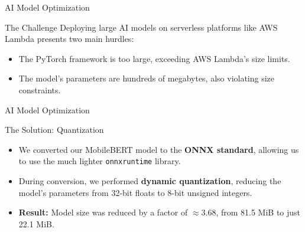 \documentclass{beamer}
\begin{document}
\begin{frame}{AI Model Optimization}
    \begin{alertblock}{The Challenge}
        Deploying large AI models on serverless platforms like AWS Lambda presents two main hurdles:
        \begin{itemize}
            \item The PyTorch framework is too large, exceeding AWS Lambda's size limits.
            \item The model's parameters are hundreds of megabytes, also violating size constraints.
        \end{itemize}
    \end{alertblock}
\end{frame}

\begin{frame}{AI Model Optimization}
    \begin{exampleblock}{The Solution: Quantization}
        \begin{itemize}
            \item We converted our MobileBERT model to the \textbf{ONNX standard}, allowing us to use the much lighter \texttt{onnxruntime} library.
            \item During conversion, we performed \textbf{dynamic quantization}, reducing the model's parameters from 32-bit floats to 8-bit unsigned integers.
            \item \textbf{Result:} Model size was reduced by a factor of $\approx3.68$, from 81.5 MiB to just 22.1 MiB.
        \end{itemize}
    \end{exampleblock}
\end{frame}
\end{document}
